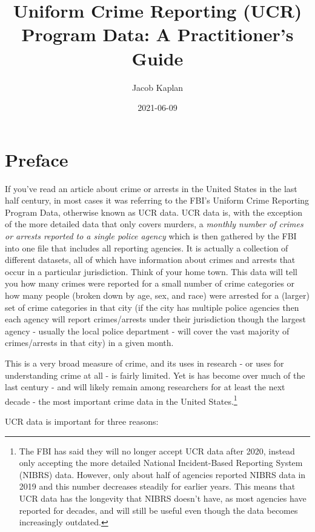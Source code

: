\documentclass[
  12pt,
  openany]{book}
\title{Uniform Crime Reporting (UCR) Program Data: A Practitioner's Guide}
\author{Jacob Kaplan}
\date{2021-06-09}
\begin{document}
\maketitle

{
\hypersetup{linkcolor=}
\setcounter{tocdepth}{2}
\tableofcontents
}
\listoftables
\listoffigures
{}
\hypertarget{preface}{%
\chapter{Preface}\label{preface}}

If you've read an article about crime or arrests in the United States in the last half century, in most cases it was referring to the FBI's Uniform Crime Reporting Program Data, otherwise known as UCR data. UCR data is, with the exception of the more detailed data that only covers murders, a \emph{monthly number of crimes or arrests reported to a single police agency} which is then gathered by the FBI into one file that includes all reporting agencies. It is actually a collection of different datasets, all of which have information about crimes and arrests that occur in a particular jurisdiction. Think of your home town. This data will tell you how many crimes were reported for a small number of crime categories or how many people (broken down by age, sex, and race) were arrested for a (larger) set of crime categories in that city (if the city has multiple police agencies then each agency will report crimes/arrests under their jurisdiction though the largest agency - usually the local police department - will cover the vast majority of crimes/arrests in that city) in a given month.

This is a very broad measure of crime, and its uses in research - or uses for understanding crime at all - is fairly limited. Yet is has become over much of the last century - and will likely remain among researchers for at least the next decade - the most important crime data in the United States.\footnote{The FBI has said they will no longer accept UCR data after 2020, instead only accepting the more detailed National Incident-Based Reporting System (NIBRS) data. However, only about half of agencies reported NIBRS data in 2019 and this number decreases steadily for earlier years. This means that UCR data has the longevity that NIBRS doesn't have, as most agencies have reported for decades, and will still be useful even though the data becomes increasingly outdated.}

UCR data is important for three reasons:
\end{document}
